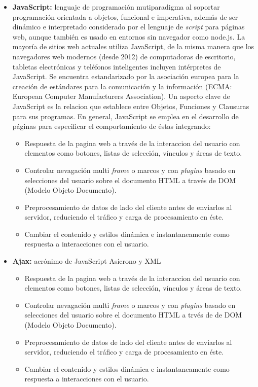 \begin{itemize}
        
    \item \textbf{JavaScript:} lenguaje de programación mutiparadigma al soportar programación orientada a objetos, funcional e imperativa, además de ser dinámico e interpretado considerado por el lenguaje de \textit{script} para páginas web, aunque también es usado en entornos sin navegador como node.js. La mayoría de sitios web actuales utiliza JavaScript, de la misma manera que los navegadores web modernos (desde 2012) de computadoras de escritorio, tabletas electrónicas y teléfonos inteligentes incluyen intérpretes de JavaScript. Se encuentra estandarizado por la asociación europea para la creación de estándares para la comunicación y la información (ECMA: European Computer Manufacturers Association). Un aspecto clave de JavaScript es la relacion que establece entre Objetos, Funciones y Clausuras para sus programas. En general, JavaScript se emplea en el desarrollo de páginas para especificar el comportamiento de éstas integrando:
        \begin{itemize}
            \item Respuesta de la pagina web a través de la interaccion del usuario con elementos como botones, listas de selección, vínculos y áreas de texto.
            \item Controlar nevagación multi \textit{frame} o marcos y con \textit{plugins} basado en selecciones del usuario sobre el documento HTML a través de DOM (Modelo Objeto Documento).
            \item Preprocesamiento de datos de lado del cliente antes de enviarlos al servidor, reduciendo el tráfico y carga de procesamiento en éste.
            \item Cambiar el contenido y estilos dinámica e instantaneamente como respuesta a interacciones con el usuario.
        \end{itemize}
        
    \item \textbf{Ajax:} acrónimo de JavaScript Asícrono y XML
        \begin{itemize}
            \item Respuesta de la pagina web a través de la interaccion del usuario con elementos como botones, listas de selección, vínculos y áreas de texto.
            \item Controlar nevagación multi \textit{frame} o marcos y con \textit{plugins} basado en selecciones del usuario sobre el documento HTML a trvés de de DOM (Modelo Objeto Documento).
            \item Preprocesamiento de datos de lado del cliente antes de enviarlos al servidor, reduciendo el tráfico y carga de procesamiento en éste.
            \item Cambiar el contenido y estilos dinámica e instantaneamente como respuesta a interacciones con el usuario.
        \end{itemize}
        

\end{itemize}
